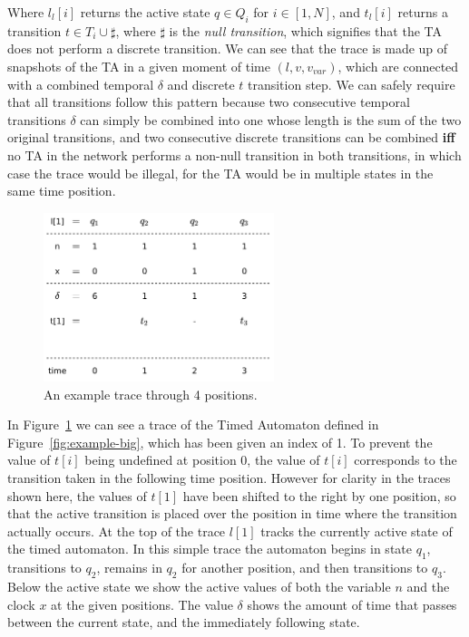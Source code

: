 \documentclass[a4paper,11pt]{report}
\theoremstyle{definition}
\begin{document}
Where $l_{l}[i]$ returns the active state $q \in Q_{i}$ for $i \in [1,N]$, and
$t_{l}[i]$ returns a transition $t \in T_{i} \cup \sharp$, where $\sharp$ is the
\emph{null transition}, which signifies that the TA does not perform a discrete
transition. We can see that the trace is made up of snapshots of the TA in a
given moment of time $(l,v,v_{var})$, which are connected with a combined
temporal $\delta$ and discrete $t$ transition step. We can safely require that
all transitions follow this pattern because two consecutive temporal transitions
$\delta$ can simply be combined into one whose length is the sum of the two
original transitions, and two consecutive discrete transitions can be combined
\textbf{iff} no TA in the network performs a non-null transition in both
transitions, in which case the trace would be illegal, for the TA would be in
multiple states in the same time position.

\begin{figure}[h]
  \centering
  \includegraphics[width=0.6\textwidth]{trace-shift-min}
  \caption{An example trace through 4 positions.}
  \label{fig:trace-min}
\end{figure}

In Figure~\ref{fig:trace-min} we can see a trace of the Timed Automaton defined
in Figure~\ref{fig:example-big}, which has been given an index of 1. To prevent
the value of $t[i]$ being undefined at position $0$, the value of $t[i]$
corresponds to the transition taken in the following time position. However for
clarity in the traces shown here, the values of $t[1]$ have been shifted to the
right by one position, so that the active transition is placed over the position
in time where the transition actually occurs. At the top of the trace $l[1]$
tracks the currently active state of the timed automaton. In this simple trace
the automaton begins in state $q_{1}$, transitions to $q_{2}$, remains in
$q_{2}$ for another position, and then transitions to $q_{3}$. Below the active
state we show the active values of both the variable $n$ and the clock $x$ at
the given positions. The value $\delta$ shows the amount of time that passes
between the current state, and the immediately following state.
\end{document}
